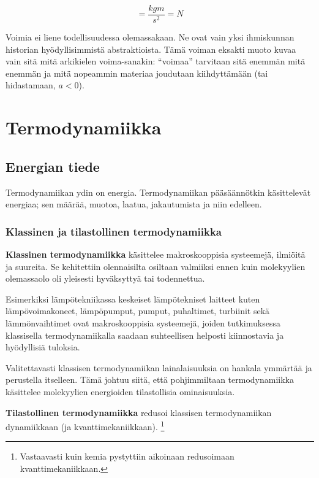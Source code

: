 \documentclass[12pt,a4paper,finnish]{book}
\begin{document}
\begin{equation}
 [F] = \frac{kgm}{s^2} = N
\end{equation}

Voimia ei liene todellisuudessa olemassakaan. Ne ovat vain yksi ihmiskunnan historian hyödyllisimmistä abstraktioista. 
Tämä voiman eksakti muoto kuvaa vain sitä mitä arkikielen voima-sanakin: ``voimaa'' tarvitaan sitä enemmän mitä enemmän 
ja mitä nopeammin materiaa joudutaan kiihdyttämään (tai hidastamaan, $ a < 0$).


\part{Termodynamiikka} %


\chapter{Energian tiede} %

Termodynamiikan ydin on energia. Termodynamiikan pääsäännötkin käsittelevät energiaa; sen määrää, 
muotoa, laatua, jakautumista ja niin edelleen.

\section{Klassinen ja tilastollinen termodynamiikka}

\textbf{Klassinen termodynamiikka} käsittelee makroskooppisia systeemejä, ilmiöitä ja suureita. Se kehitettiin 
olennaisilta osiltaan valmiiksi ennen kuin molekyylien olemassaolo oli yleisesti hyväksyttyä tai todennettua. 

Esimerkiksi lämpötekniikassa keskeiset lämpötekniset laitteet kuten lämpövoimakoneet, 
lämpöpumput, pumput, puhaltimet, turbiinit sekä lämmönvaihtimet ovat makroskooppisia systeemejä, joiden 
tutkimuksessa klassisella termodynamiikalla saadaan suhteellisen helposti kiinnostavia ja hyödyllisiä tuloksia.

Valitettavasti klassisen termodynamiikan lainalaisuuksia on hankala ymmärtää ja perustella itselleen. Tämä johtuu 
siitä, että pohjimmiltaan termodynamiikka käsittelee molekyylien energioiden tilastollisia ominaisuuksia.

\textbf{Tilastollinen termodynamiikka} redusoi klassisen termodynamiikan dynamiikkaan (ja kvanttimekaniikkaan).
\footnote{Vastaavasti kuin kemia pystyttiin aikoinaan redusoimaan kvanttimekaniikkaan.} 
\end{document}
